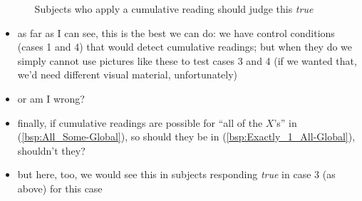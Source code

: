 \documentclass[fleqn,reqno,10pt,draft]{article}
\begin{document}
\begin{itemize}
\begin{itemize}
\begin{center}

    \end{center}

    Subjects who apply a cumulative reading should judge this
    \emph{true}
  \end{itemize}
\item as far as I can see, this is the best we can do: we have control
  conditions (cases 1 and 4) that would detect cumulative
  readings; but when they do we simply cannot use pictures like these
  to test cases 3 and 4 (if we wanted that, we'd need different visual
  material, unfortunately)
\item or am I wrong?
\item finally, if cumulative readings are possible for ``all of the
  $X$'s'' in (\ref{bsp:All_Some-Global}), so should they be in
  (\ref{bsp:Exactly_1_All-Global}), shouldn't they?
\item but here, too, we would see this in subjects responding
  \emph{true} in case 3 (as above) for this case
\end{itemize}
\end{document}
